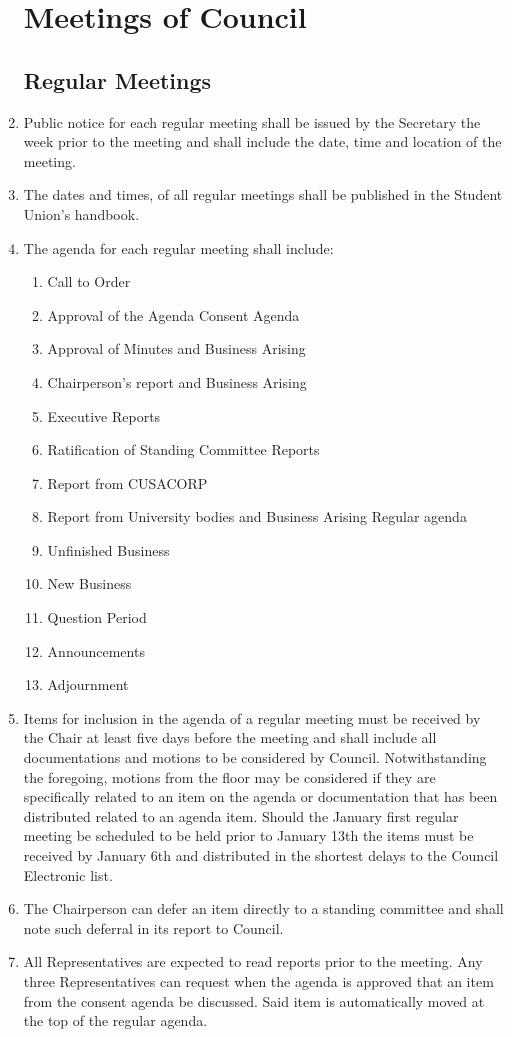 \documentclass[oneside]{book}
\begin{document}
\begin{enumerate}
\chapter{\label{Meetings_of_Council}Meetings of Council }


\section{\label{Regular_Meetings}Regular Meetings }
\item Public notice for each regular meeting shall be issued by the Secretary
the week prior to the meeting and shall include the date, time and
location of the meeting. 
\item The dates and times, of all regular meetings shall be published in
the Student Union's handbook. 
\item The agenda for each regular meeting shall include: 

\begin{enumerate}
\item Call to Order 
\item Approval of the Agenda
Consent Agenda 
\item Approval of Minutes and Business Arising 
\item Chairperson's report and Business Arising 
\item Executive Reports 
\item Ratification of Standing Committee Reports
\item Report from CUSACORP 
\item Report from University bodies and Business Arising
Regular agenda 
\item Unfinished Business 
\item New Business 
\item Question Period 
\item Announcements 
\item Adjournment 
\end{enumerate}
\item Items for inclusion in the agenda of a regular meeting must be received
by the Chair at least five days before the meeting and shall include
all documentations and motions to be considered by Council. Notwithstanding
the foregoing, motions from the floor may be considered if they are
specifically related to an item on the agenda or documentation that
has been distributed related to an agenda item. Should the January
first regular meeting be scheduled to be held prior to January 13th
the items must be received by January 6th and distributed in the shortest
delays to the Council Electronic list. 
\item The Chairperson can defer an item directly to a standing committee
and shall note such deferral in its report to Council. 
\item All Representatives are expected to read reports prior to the meeting.
Any three Representatives can request when the agenda is approved
that an item from the consent agenda be discussed. Said item is automatically
moved at the top of the regular agenda. 


\end{enumerate}
\end{document}
